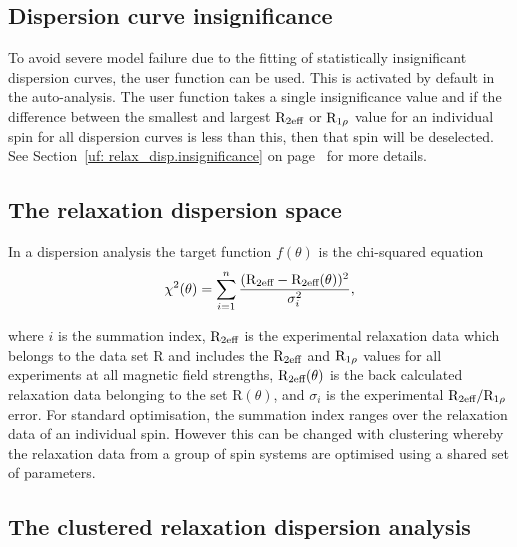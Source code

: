 
\subsection{Dispersion curve insignificance}
\label{sect: Dispersion curve insignificance}

To avoid severe model failure due to the fitting of statistically insignificant dispersion curves, the  user function can be used.
This is activated by default in the auto-analysis.
The user function takes a single insignificance value and if the difference between the smallest and largest $\mathrm{R}_{\textrm{2eff}}$ or $\mathrm{R}_{1\rho}$ value for an individual spin for all dispersion curves is less than this, then that spin will be deselected.
See Section~\ref{uf: relax_disp.insignificance} on page~\pageref{uf: relax_disp.insignificance} for more details.



\subsection{The relaxation dispersion space}

In a dispersion analysis the target function $f(\theta)$ is the chi-squared equation
\begin{equation} \label{eq: chi2 dispersion}
 \chi^2(\theta) = \sum_{i=1}^n \frac{(\mathrm{R}_{\textrm{2eff}} - \mathrm{R}_{\textrm{2eff}}(\theta))^2}{\sigma_i^2},
\end{equation}

\noindent where $i$ is the summation index, $\mathrm{R}_{\textrm{2eff}}$ is the experimental relaxation data which belongs to the data set R and includes the $\mathrm{R}_{\textrm{2eff}}$ and $\mathrm{R}_{1\rho}$ values for all experiments at all magnetic field strengths, $\mathrm{R}_{\textrm{2eff}}(\theta)$ is the back calculated relaxation data belonging to the set R$(\theta)$, and $\sigma_i$ is the experimental $\mathrm{R}_{\textrm{2eff}}/\mathrm{R}_{1\rho}$ error.
For standard optimisation, the summation index ranges over the relaxation data of an individual spin.
However this can be changed with clustering whereby the relaxation data from a group of spin systems are optimised using a shared set of parameters.



\subsection{The clustered relaxation dispersion analysis}

